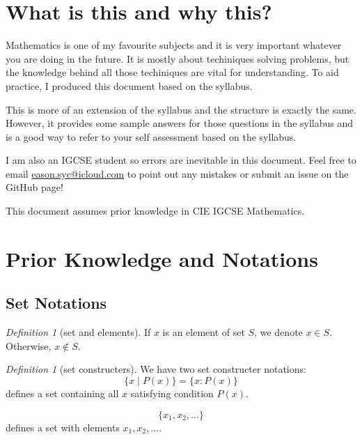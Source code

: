 \documentclass[8pt]{article}
\author{\Author}
\title{\Title}
\date{Version 1. \Date}
\theoremstyle{remark}
\newtheorem{definition}[theorem]{Definition}
\begin{document}
	\maketitle

	\tableofcontents

    \section*{What is this and why this?}

        Mathematics is one of my favourite subjects and it is very important whatever you are doing in the future. It is mostly about techiniques solving problems, but the knowledge behind all those techiniques are vital for understanding. To aid practice, I produced this document based on the syllabus.

        This is more of an extension of the syllabus and the structure is exactly the same. However, it provides some sample answers for those questions in the syllabus and is a good way to refer to your self assessment based on the syllabus.

        I am also an IGCSE student so errors are inevitable in this document. Feel free to email \href{eason.syc@icloud.com}{eason.syc@icloud.com} to point out any mistakes or submit an issue on the GitHub page!

        This document assumes prior knowledge in CIE IGCSE Mathematics.

    \setcounter{section}{-1}
    
    \section{Prior Knowledge and Notations}
        \subsection{Set Notations}

            \begin{definition}[set and elements]
                If $x$ is an element of set $S$, we denote $x \in S$. Otherwise, $x \notin S$.
            \end{definition}

            \begin{definition}[set constructers]
                We have two set constructer notations:
                $$
                    \{x \mid P(x)\} = \{x : P(x)\}
                $$
                defines a set containing all $x$ satisfying condition $P(x)$.

                $$
                    \{x_1, x_2, \ldots\}
                $$
                defines a set with elements $x_1, x_2, \ldots$.
            \end{definition}
\end{document}
